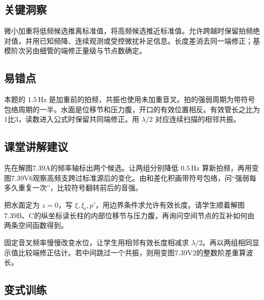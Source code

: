 \documentclass[UTF8,fontset=fandol,a4paper,11pt]{ctexart}
\begin{document}


\subsection*{关键洞察}

微小加重将低频候选推离标准值，将高频候选推近标准值。允许跨越时保留拍频绝对值，并用已知频降、连续观测或受控微扰补足信息。长度差消去同一端修正；基模阶次另由细管的端修正量级与节点数确定。




\subsection*{易错点}

本题的 $1.5\,\mathrm{Hz}$ 是加重前的拍频，共振也使用未加重音叉。拍的强弱周期为带符号包络周期的一半。水面是位移节和压力腹，开口的有效位置相反。有效管长之比为1比3，读数进入公式时保留共同端修正。用 $\lambda/2$ 对应连续扫描的相邻共振。




\subsection*{课堂讲解建议}

先在解图7.39A的频率轴标出两个候选。让两组分别降低 $0.5\,\mathrm{Hz}$ 算新拍频，再用变图7.39V6观察高频支跨过标准源后的变化。由和差化积画带符号包络，问“强弱每多久重复一次”，比较符号翻转前后的音强。

把水面定为 $z=0$，写 $\xi,\xi_t,p'$，用边界条件求允许有效长度。请学生顺着解图7.39B、C的纵坐标读长柱的内部位移节与压力腹，再询问空间节点的互补如何由两条空间函数得到。

固定音叉频率慢慢改变水位，让学生用相邻有效长度相减求 $\lambda/2$。再以两组相同显示值比较端修正估计。若中间跳过一个共振，则用变图7.39V2的整数阶差重算波长。




\subsection*{变式训练}
\end{document}
